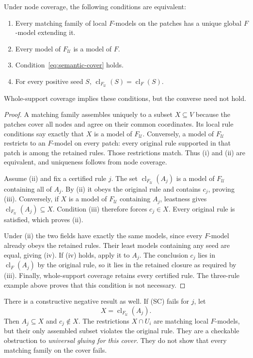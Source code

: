 \begin{theorem}
\label{res:new:semantic-cover}
Under node coverage, the following conditions are equivalent:
\begin{enumerate}[label=(\roman*)]
\item Every matching family of local $F$-models on the patches has a unique global $F$-model extending it.
\item Every model of $F_{\mathcal U}$ is a model of $F$.
\item Condition~\eqref{eq:semantic-cover} holds.
\item For every positive seed $S$, $\operatorname{cl}_{F_{\mathcal U}}(S)=\operatorname{cl}_F(S)$.
\end{enumerate}
Whole-support coverage implies these conditions, but the converse need not hold.
\end{theorem}
\begin{proof}
A matching family assembles uniquely to a subset $X\subseteq V$ because the patches cover all nodes and agree on their common coordinates. Its local rule conditions say exactly that $X$ is a model of $F_{\mathcal U}$. Conversely, a model of $F_{\mathcal U}$ restricts to an $F$-model on every patch: every original rule supported in that patch is among the retained rules. Those restrictions match. Thus (i) and (ii) are equivalent, and uniqueness follows from node coverage.

Assume (ii) and fix a certified rule $j$. The set $\operatorname{cl}_{F_{\mathcal U}}(A_j)$ is a model of $F_{\mathcal U}$ containing all of $A_j$. By (ii) it obeys the original rule and contains $c_j$, proving (iii). Conversely, if $X$ is a model of $F_{\mathcal U}$ containing $A_j$, leastness gives $\operatorname{cl}_{F_{\mathcal U}}(A_j)\subseteq X$. Condition (iii) therefore forces $c_j\in X$. Every original rule is satisfied, which proves (ii).

Under (ii) the two fields have exactly the same models, since every $F$-model already obeys the retained rules. Their least models containing any seed are equal, giving (iv). If (iv) holds, apply it to $A_j$. The conclusion $c_j$ lies in $\operatorname{cl}_F(A_j)$ by the original rule, so it lies in the retained closure as required by (iii). Finally, whole-support coverage retains every certified rule. The three-rule example above proves that this condition is not necessary.
\end{proof}

There is a constructive negative result as well. If (SC) fails for $j$, let
\[
 X=\operatorname{cl}_{F_{\mathcal U}}(A_j).
\]
Then $A_j\subseteq X$ and $c_j\notin X$. The restrictions $X\cap U_i$ are matching local $F$-models, but their only assembled subset violates the original rule. They are a checkable obstruction to \emph{universal gluing for this cover}. They do not show that every matching family on the cover fails.

